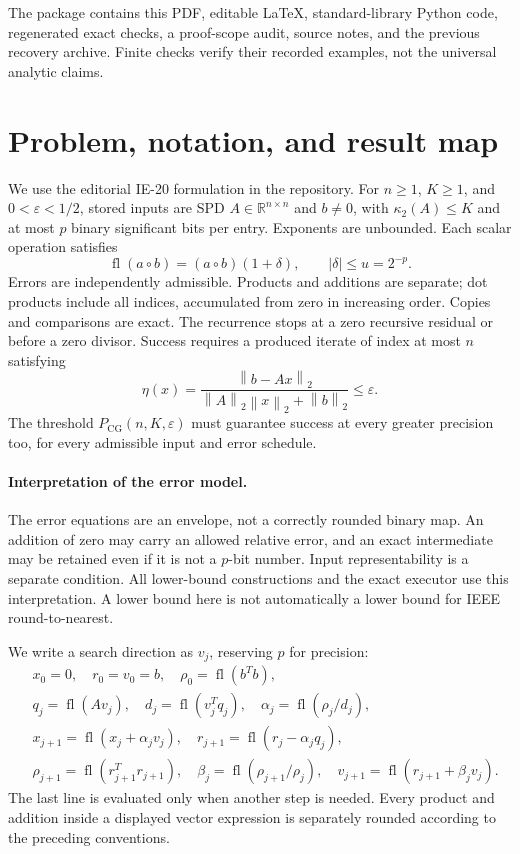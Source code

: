 \documentclass[11pt]{article}
\theoremstyle{remark}\newtheorem{remark}[theorem]{Remark}
\newcommand{\R}{\mathbb R}
\newcommand{\norm}[1]{\left\lVert#1\right\rVert_2}
\newcommand{\fl}{\operatorname{fl}}
\newcommand{\PCG}{P_{\mathrm{CG}}}
\newcommand{\eps}{\varepsilon}
\begin{document}
\begin{titlepage}
\vfill
\small
The package contains this PDF, editable \LaTeX, standard-library Python
code, regenerated exact checks, a proof-scope audit, source notes, and the
previous recovery archive. Finite checks verify their recorded examples,
not the universal analytic claims.
\end{titlepage}
\hypersetup{pageanchor=true}
\tableofcontents
\newpage
{}

\section{Problem, notation, and result map}
\label{sec:problem}

We use the editorial IE-20 formulation in the repository\cite{ie20}.
For $n\ge1$, $K\ge1$, and $0<\eps<1/2$, stored inputs are SPD
$A\in\R^{n\times n}$ and $b\ne0$, with $\kappa_2(A)\le K$ and at most
$p$ binary significant bits per entry. Exponents are unbounded. Each
scalar operation satisfies
\[
\fl(a\circ b)=(a\circ b)(1+\delta),\qquad |\delta|\le u=2^{-p}.
\]
Errors are independently admissible. Products and additions are separate;
dot products include all indices, accumulated from zero in increasing
order. Copies and comparisons are exact. The recurrence stops at a zero
recursive residual or before a zero divisor. Success requires a produced
iterate of index at most $n$ satisfying
\begin{equation}\label{eq:eta}
\eta(x)=\frac{\norm{b-Ax}}{\norm A\norm x+\norm b}\le\eps.
\end{equation}
The threshold $\PCG(n,K,\eps)$ must guarantee success at every greater
precision too, for every admissible input and error schedule.

\paragraph{Interpretation of the error model.}
The error equations are an envelope, not a correctly rounded binary map.
An addition of zero may carry an allowed relative error, and an exact
intermediate may be retained even if it is not a $p$-bit number. Input
representability is a separate condition. All lower-bound constructions
and the exact executor use this interpretation. A lower bound here is
not automatically a lower bound for IEEE round-to-nearest.

We write a search direction as $v_j$, reserving $p$ for precision:
\begin{align*}
&x_0=0,\quad r_0=v_0=b,\quad \rho_0=\fl(b^Tb),\\
&q_j=\fl(Av_j),\quad d_j=\fl(v_j^Tq_j),\quad
\alpha_j=\fl(\rho_j/d_j),\\
&x_{j+1}=\fl(x_j+\alpha_jv_j),\quad
r_{j+1}=\fl(r_j-\alpha_jq_j),\\
&\rho_{j+1}=\fl(r_{j+1}^Tr_{j+1}),\quad
\beta_j=\fl(\rho_{j+1}/\rho_j),\quad
v_{j+1}=\fl(r_{j+1}+\beta_jv_j).
\end{align*}
The last line is evaluated only when another step is needed. Every
product and addition inside a displayed vector expression is separately
rounded according to the preceding conventions.
\end{document}
